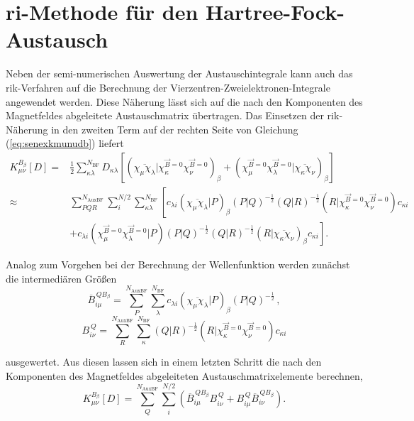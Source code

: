\vfill	
\newpage
\section*{\acs{ri}-Methode für den Hartree-Fock-Austausch}
Neben der semi-numerischen Auswertung der Austauschintegrale kann auch das \ac{rik}-Verfahren auf die Berechnung der Vierzentren-Zweielektronen-Integrale angewendet werden.\supercite{weigend2002fully} Diese Näherung lässt sich auf die nach den Komponenten des Magnetfeldes abgeleitete Austauschmatrix übertragen. Das Einsetzen der \ac{rik}-Näherung in den zweiten Term auf der rechten Seite von Gleichung (\ref{eq:senexkmunudb}) liefert
\begin{equation}
\begin{aligned}
K_{\mu\nu}^{B_\beta}[D]=&\frac{1}{2}\sum_{\kappa\lambda}^{N_{\textrm{BF}}}D_{\kappa\lambda} \left[\left(\overline{\chi_\mu\chi_\lambda}\vert\chi_\kappa^{\vec{B}=0}\chi_\nu^{\vec{B}=0}\right)_\beta+\left(\chi_\mu^{\vec{B}=0}\chi_\lambda^{\vec{B}=0}\vert\overline{\chi_\kappa\chi_\nu}\right)_\beta\right]\\
\approx& \sum_{PQR}^{N_{\text{AuxBF}}}\sum_i^{N/2}\sum_{\kappa\lambda}^{N_{\textrm{BF}}}\left[ c_{\lambda i} \left(\overline{\chi_\mu\chi_\lambda}\vert P\right)_\beta\left(P\vert Q\right)^{-\frac{1}{2}} \left(Q\vert R\right)^{-\frac{1}{2}} \left(R \vert\chi_\kappa^{\vec{B}=0}\chi_\nu^{\vec{B}=0}\right)c_{\kappa i} \right.\\
&\left.+c_{\lambda i}\left(\chi_\mu^{\vec{B}=0}\chi_\lambda^{\vec{B}=0}\vert P\right)\left(P\vert Q\right)^{-\frac{1}{2}} \left(Q\vert R\right)^{-\frac{1}{2}} \left(R\vert\overline{\chi_\kappa\chi_\nu}\right)_\beta c_{\kappa i}\right].
\end{aligned}
\end{equation}

Analog zum Vorgehen bei der Berechnung der Wellenfunktion werden zunächst die intermediären Größen 
\begin{equation}
\overline{B}_{i\mu}^{\,QB_\beta}=\sum_P^{N_{\text{AuxBF}}}\sum_{\lambda}^{N_{\textrm{BF}}}c_{\lambda i} \left(\overline{\chi_\mu\chi_\lambda}\vert P\right)_\beta\left(P\vert Q\right)^{-\frac{1}{2}}\, ,
\end{equation}
\begin{equation}
B_{i\nu}^{\,Q}=\sum_R^{N_{\text{AuxBF}}}\sum_{\kappa}^{N_{\textrm{BF}}}\left(Q\vert R\right)^{-\frac{1}{2}} \left(R \vert\chi_\kappa^{\vec{B}=0}\chi_\nu^{\vec{B}=0}\right)c_{\kappa i}
\end{equation}

ausgewertet. Aus diesen lassen sich in einem letzten Schritt die nach den Komponenten des Magnetfeldes abgeleiteten Austauschmatrixelemente berechnen,
\begin{equation}
K_{\mu\nu}^{B_\beta}[D]=\sum_Q^{N_{\text{AuxBF}}}\sum_i^{N/2}\left(\overline{B}_{i\mu}^{\,QB_\beta} B_{i\nu}^{\,Q}+B_{i\mu}^{\,Q}\overline{B}_{i\nu}^{\,QB_\beta}\right).
\end{equation}